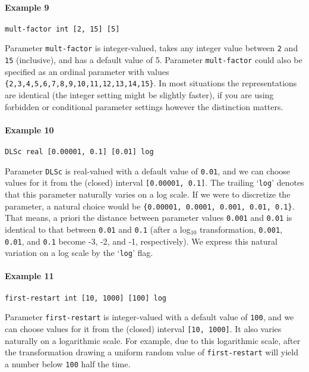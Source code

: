 \documentclass[manual.tex]{subfiles}
\begin{document}
\paragraph{Example 9}
\begin{verbatim}
mult-factor int [2, 15] [5]
\end{verbatim}
Parameter \texttt{mult-factor} is integer-valued, takes any integer value between \texttt{2} and \texttt{15} (inclusive), and has a default value of 5. Parameter \texttt{mult-factor} could also be specified as an ordinal parameter with values \texttt{\{2,3,4,5,6,7,8,9,10,11,12,13,14,15\}}. In most situations the representations are identical (the integer setting might be slightly faster), if you are using forbidden or conditional parameter settings however the distinction matters.



\paragraph{Example 10}
\begin{verbatim}
DLSc real [0.00001, 0.1] [0.01] log
\end{verbatim}
Parameter \texttt{DLSc} is real-valued with a default value of \texttt{0.01}, and we can choose values for it from the (closed) interval \texttt{[0.00001, 0.1]}.
The trailing `\texttt{log}' denotes that this parameter naturally varies on a log scale. If we were to discretize the parameter, a natural choice would be
\texttt{\{0.00001, 0.0001, 0.001, 0.01, 0.1\}}. That means, a priori the distance between parameter values \texttt{0.001} and \texttt{0.01} is identical to that between \texttt{0.01} and \texttt{0.1} (after a log$_{10}$ transformation, \texttt{0.001}, \texttt{0.01}, and \texttt{0.1} become -3, -2, and -1, respectively).
We express this natural variation on a log scale by the `\texttt{log}' flag. %

\paragraph{Example 11}
\begin{verbatim}
first-restart int [10, 1000] [100] log
\end{verbatim}
Parameter \texttt{first-restart} is integer-valued with a default value of \texttt{100}, and we can choose values for it from the (closed) interval \texttt{[10, 1000]}.
It also varies naturally on a logarithmic scale. For example, due to this logarithmic scale, after the transformation drawing a uniform random value of \texttt{first-restart} will yield a number below \texttt{100} half the time.
\end{document}
